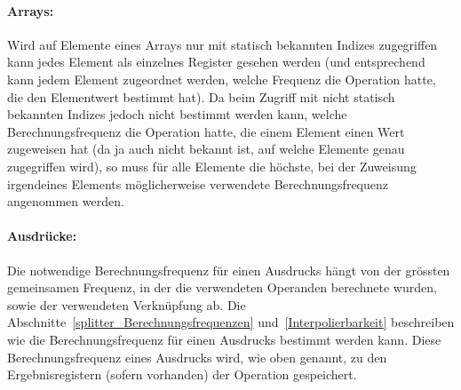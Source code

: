 \documentclass[twoside,a4paper,fleqn,12pt]{book}
\begin{document}
\paragraph{Arrays:} %
Wird auf Elemente eines Arrays nur mit statisch bekannten Indizes zugegriffen kann jedes Element als einzelnes Register gesehen werden
(und entsprechend kann jedem Element zugeordnet werden, welche Frequenz die Operation hatte, die den Elementwert bestimmt hat).
Da beim Zugriff mit nicht statisch bekannten Indizes jedoch nicht bestimmt werden kann, welche Berechnungsfrequenz 
die Operation hatte, die einem Element einen Wert zugeweisen hat (da ja auch nicht bekannt ist, auf welche Elemente genau zugegriffen wird),
so muss für alle Elemente die höchste, bei der Zuweisung irgendeines Elements möglicherweise verwendete Berechnungsfrequenz angenommen werden.

\paragraph{Ausdrücke:}
Die notwendige Berechnungsfrequenz für einen Ausdrucks hängt von der grössten gemeinsamen Frequenz,
in der die verwendeten Operanden berechnete wurden, sowie der verwendeten Verknüpfung ab.
Die Abschnitte~\ref{splitter_Berechnungsfrequenzen} und~\ref{Interpolierbarkeit} beschreiben wie die Berechnungsfrequenz für einen Ausdrucks bestimmt werden kann.
Diese Berechnungsfrequenz eines Ausdrucks wird, wie oben genannt, zu den Ergebnisregistern (sofern vorhanden) der Operation gespeichert.

\end{document}
